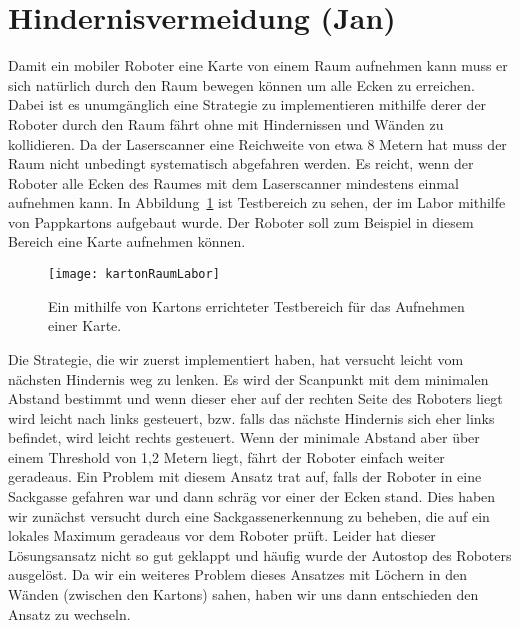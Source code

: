 \section{Hindernisvermeidung (Jan)}

Damit ein mobiler Roboter eine Karte von einem Raum aufnehmen kann muss er sich natürlich durch den Raum bewegen können um alle Ecken zu erreichen. Dabei ist es unumgänglich eine Strategie zu implementieren mithilfe derer der Roboter durch den Raum fährt ohne mit Hindernissen und Wänden zu kollidieren.
Da der Laserscanner eine Reichweite von etwa 8 Metern hat muss der Raum nicht unbedingt systematisch abgefahren werden. Es reicht, wenn der Roboter alle Ecken des Raumes mit dem Laserscanner mindestens einmal aufnehmen kann. In Abbildung~\ref{fig:kartonRaumLabor} ist Testbereich zu sehen, der im Labor mithilfe von Pappkartons aufgebaut wurde. Der Roboter soll zum Beispiel in diesem Bereich eine Karte aufnehmen können.

\begin{figure}[H]
	\centering
	\texttt{[image: kartonRaumLabor]}
	\caption{Ein mithilfe von Kartons errichteter Testbereich für das Aufnehmen einer Karte.}
	\label{fig:kartonRaumLabor}
\end{figure}

Die Strategie, die wir zuerst implementiert haben, hat versucht leicht vom nächsten Hindernis weg zu lenken. Es wird der Scanpunkt mit dem minimalen Abstand bestimmt und wenn dieser eher auf der rechten Seite des Roboters liegt wird leicht nach links gesteuert, bzw. falls das nächste Hindernis sich eher links befindet, wird leicht rechts gesteuert. Wenn der minimale Abstand aber über einem Threshold von 1,2 Metern liegt, fährt der Roboter einfach weiter geradeaus.
Ein Problem mit diesem Ansatz trat auf, falls der Roboter in eine Sackgasse gefahren war und dann schräg vor einer der Ecken stand.
Dies haben wir zunächst versucht durch eine Sackgassenerkennung zu beheben, die auf ein lokales Maximum geradeaus vor dem Roboter prüft.
Leider hat dieser Lösungsansatz nicht so gut geklappt und häufig wurde der Autostop des Roboters ausgelöst. Da wir ein weiteres Problem dieses Ansatzes mit Löchern in den Wänden (zwischen den Kartons) sahen, haben wir uns dann entschieden den Ansatz zu wechseln.

